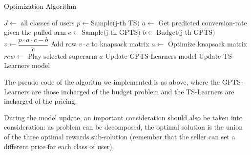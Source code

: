 \begin{algorithm}
	\renewcommand{\algorithmiccomment}[2][.4\linewidth]{%
		\leavevmode\hfill\makebox[#1][l]{//~#2}}
	\caption{Optimization Algorithm}
	\begin{algorithmic}[1]
		\STATE $J\gets ${ all classes of users}
		\STATE $p \leftarrow \text{Sample(j-th TS)}$
		\STATE $a \leftarrow$ Get predicted conversion-rate given the pulled arm
		\STATE $c \leftarrow \text{Sample(j-th GPTS)}$
		\STATE $b \leftarrow \text{Budget(j-th GPTS)}$
		\STATE $v \leftarrow \dfrac{p\cdot a\cdot c - b}{c}$
		\STATE Add row $v\cdot c$ to knapsack matrix
		\ENDFOR
		\STATE $a \leftarrow$ Optimize knapsack matrix
		\STATE $rew \leftarrow $ Play selected superarm $a$
		\STATE Update GPTS-Learners model
		\STATE Update TS-Learners model
		\ENDFOR
	\end{algorithmic}
\end{algorithm}
The pseudo code of the algoritm we implemented is as above, where the GPTS-Learners are those incharged of the budget problem and the TS-Learners are incharged of the pricing.

During the model update, an important consideration should also be taken into consideration: as problem can be decomposed, the optimal solution is the union of the three optimal rewards sub-solution (remember that the seller can set a different price for each class of user).
